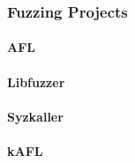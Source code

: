\subsubsection{Fuzzing Projects}

\paragraph{AFL}

\paragraph{Libfuzzer}

\paragraph{Syzkaller}

\paragraph{kAFL}